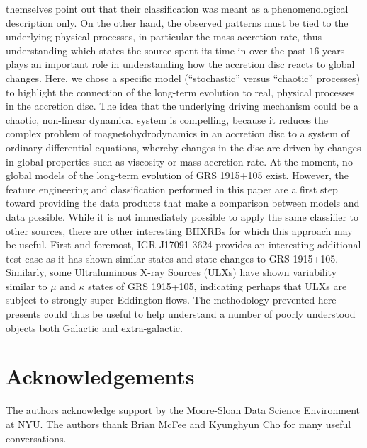 \documentclass[fleqn,usenatbib]{mnras}
\begin{document}
\citet{belloni2000} themselves point out that their classification was meant as a phenomenological description only. On the other hand, the observed patterns 
must be tied to the underlying physical processes, in particular the mass accretion rate, thus understanding which states the source spent its time in over the 
past $16$ years plays an important role in understanding how the accretion disc reacts to global changes. Here, we chose a specific model (``stochastic'' versus 
``chaotic'' processes) to highlight the connection of the long-term evolution to real, physical processes in the accretion disc. The idea that the underlying driving 
mechanism could be a chaotic, non-linear dynamical system is compelling, because it reduces the complex problem of magnetohydrodynamics in an 
accretion disc to a system of ordinary differential equations, whereby changes in the disc are driven by changes in global properties such as viscosity or mass 
accretion rate. At the moment, no global models of the long-term evolution of GRS 1915+105 exist. However, the feature engineering and classification performed 
in this paper are a first step toward providing the data products that make a comparison between models and data possible. While it is not immediately possible to 
apply the same classifier to other sources, there are other interesting BHXRBs for which this approach may be useful. First and foremost, IGR J17091-3624 provides an 
interesting additional test case as it has shown similar states and state changes to GRS 1915+105. Similarly, some Ultraluminous X-ray Sources (ULXs) have shown variability 
similar to $\mu$ and $\kappa$ states of GRS 1915+105, indicating perhaps that ULXs are subject to strongly super-Eddington flows. 
The methodology prevented here presents could thus be useful to help understand a number of poorly understood objects both Galactic and extra-galactic. 

\section*{Acknowledgements}

The authors acknowledge support by the Moore-Sloan Data Science Environment at NYU. The authors thank Brian McFee and Kyunghyun Cho for many useful conversations.









\bsp	%
\label{lastpage}
\end{document}
